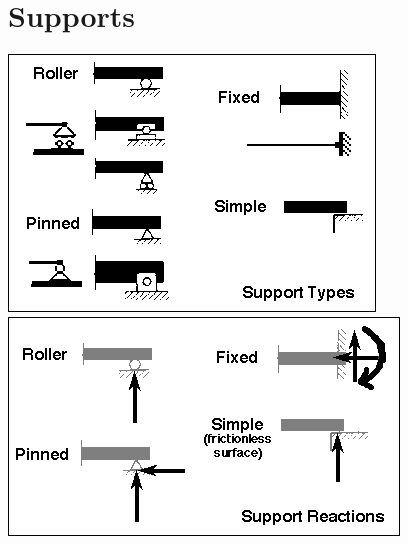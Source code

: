 \documentclass[a4paper, 12pt]{article}
\begin{document}
\section{Supports}
\includegraphics[scale=0.5]{supports}
\includegraphics[scale=0.59]{supports-reactions}
\end{document}

